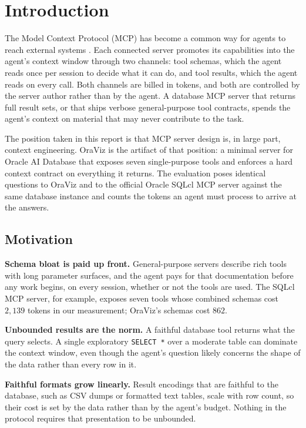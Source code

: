 \section{Introduction}\label{sec:introduction}

The Model Context Protocol (MCP) has become a common way for agents to reach external systems \cite{anthropicmcp2024, mcpspec2025}. Each connected server promotes its capabilities into the agent's context window through two channels: tool schemas, which the agent reads once per session to decide what it can do, and tool results, which the agent reads on every call. Both channels are billed in tokens, and both are controlled by the server author rather than by the agent. A database MCP server that returns full result sets, or that ships verbose general-purpose tool contracts, spends the agent's context on material that may never contribute to the task.

The position taken in this report is that MCP server design is, in large part, context engineering. OraViz is the artifact of that position: a minimal server for Oracle AI Database that exposes seven single-purpose tools and enforces a hard context contract on everything it returns. The evaluation poses identical questions to OraViz and to the official Oracle SQLcl MCP server against the same database instance and counts the tokens an agent must process to arrive at the answers.

\subsection{Motivation}

\textbf{Schema bloat is paid up front.} General-purpose servers describe rich tools with long parameter surfaces, and the agent pays for that documentation before any work begins, on every session, whether or not the tools are used. The SQLcl MCP server, for example, exposes seven tools whose combined schemas cost $2{,}139$ tokens in our measurement; OraViz's schemas cost $862$.

\textbf{Unbounded results are the norm.} A faithful database tool returns what the query selects. A single exploratory \texttt{SELECT *} over a moderate table can dominate the context window, even though the agent's question likely concerns the shape of the data rather than every row in it.

\textbf{Faithful formats grow linearly.} Result encodings that are faithful to the database, such as CSV dumps or formatted text tables, scale with row count, so their cost is set by the data rather than by the agent's budget. Nothing in the protocol requires that presentation to be unbounded.


